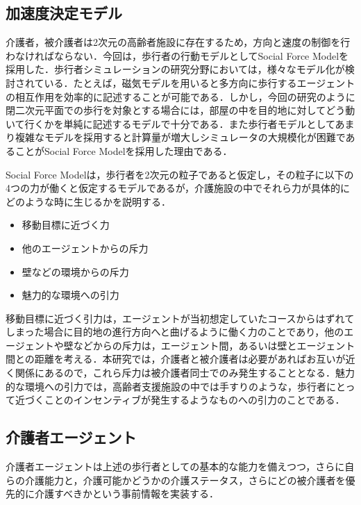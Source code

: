 \subsection{加速度決定モデル}

介護者，被介護者は2次元の高齢者施設に存在するため，方向と速度の制御を行わなければならない．今回は，歩行者の行動モデルとしてSocial Force Model\cite{SFM}を採用した．歩行者シミュレーションの研究分野においては，様々なモデル化が検討されている\cite{ex_pedestrian_simulation_1,ex_pedestrian_simulation_2}．たとえば，磁気モデルを用いると多方向に歩行するエージェントの相互作用を効率的に記述することが可能である．しかし，今回の研究のように閉二次元平面での歩行を対象とする場合には，部屋の中を目的地に対してどう動いて行くかを単純に記述するモデルで十分である．また歩行者モデルとしてあまり複雑なモデルを採用すると計算量が増大しシミュレータの大規模化が困難であることがSocial Force Modelを採用した理由である．

Social Force Modelは，歩行者を2次元の粒子であると仮定し，その粒子に以下の4つの力が働くと仮定するモデルであるが，介護施設の中でそれら力が具体的にどのような時に生じるかを説明する．

\begin{itemize}
 \item 移動目標に近づく力
 \item 他のエージェントからの斥力
 \item 壁などの環境からの斥力
 \item 魅力的な環境への引力
\end{itemize}

移動目標に近づく引力は，エージェントが当初想定していたコースからはずれてしまった場合に目的地の進行方向へと曲げるように働く力のことであり，他のエージェントや壁などからの斥力は，エージェント間，あるいは壁とエージェント間との距離を考える．本研究では，介護者と被介護者は必要があればお互いが近く関係にあるので，これら斥力は被介護者同士でのみ発生することとなる．魅力的な環境への引力では，高齢者支援施設の中では手すりのような，歩行者にとって近づくことのインセンティブが発生するようなものへの引力のことである．

\subsection{介護者エージェント}

介護者エージェントは上述の歩行者としての基本的な能力を備えつつ，さらに自らの介護能力と，介護可能かどうかの介護ステータス，さらにどの被介護者を優先的に介護すべきかという事前情報を実装する．

